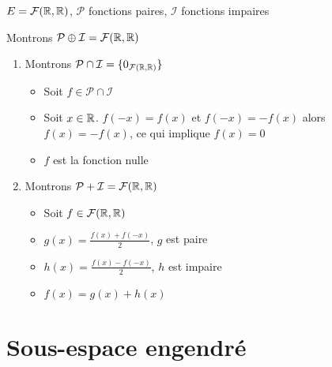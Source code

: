 \begin{frame}
  
\begin{exemple}
\label{ex:evsomme} 
$E = \mathcal{F}(\mathbb{R},\mathbb{R})$, $\mathcal{P}$ fonctions paires,  $\mathcal{I}$ fonctions impaires 

Montrons $\mathcal{P}\oplus\mathcal{I}=\mathcal{F}(\mathbb{R},\mathbb{R})$

\pause

\begin{enumerate}
  \item Montrons $\mathcal{P} \cap \mathcal{I} = \{ 0_{\mathcal{F}(\mathbb{R},\mathbb{R})} \}$
  \pause
  \begin{itemize}\setlength{\itemsep}{4pt}
    \item Soit $f \in \mathcal{P} \cap \mathcal{I}$
    \pause
    \item Soit $x \in \mathbb{R}$. $f(-x)=f(x)$ et $f(-x)=-f(x)$ alors $f(x)=-f(x)$, ce qui implique $f(x)=0$
    \pause
    \item $f$ est la fonction nulle
  \end{itemize}
 
   \medskip
  \pause 
  \item Montrons $\mathcal{P}+\mathcal{I}=\mathcal{F}(\mathbb{R},\mathbb{R})$
  \pause
  \begin{itemize}\setlength{\itemsep}{4pt}
    \item Soit $f \in \mathcal{F}(\mathbb{R},\mathbb{R})$
    \pause
    \item $g(x)=\frac{f(x)+f(-x)}2$, $g$ est paire
    \pause
    \item $h(x)=\frac{f(x)-f(-x)}2$, $h$ est impaire
    \pause
    \item $f(x)=g(x)+h(x)$ 
  \end{itemize}
 
\end{enumerate}

\end{exemple}
\end{frame}



\section{Sous-espace engendré}

